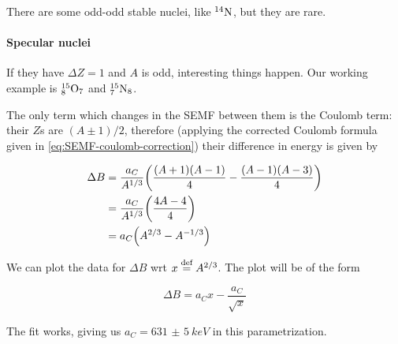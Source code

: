 \documentclass[main.tex]{subfiles}
\begin{document}
There are some odd-odd stable nuclei, like \(^{14} \ce{N} \), but they are rare.

\paragraph{Specular nuclei}

If they have \(\Delta Z = 1\) and \(A\) is odd, interesting things happen. Our working example is \(^{15} _{8   } \ce{O} _{7} \) and \(^{15} _{7} \ce{N}_8 \).

The only term which changes in the SEMF between them is the Coulomb term: their \(Z\)s are \((A \pm 1)/2\), therefore (applying the corrected Coulomb formula given in \eqref{eq:SEMF-coulomb-correction}) their difference in energy is given by

\begin{subequations}
\begin{align}
  \Delta B  &= \frac{a_C}{A^{1/3}} \qty(\frac{(A+1)(A-1)}{4} - \frac{(A-1)(A-3)}{4})  \\
  &= \frac{a_C}{A^{1/3}} \qty(\frac{4A -4}{4})  \\
  &= a_C \qty(A^{2/3} - A^{-1/3})
\end{align}
\end{subequations}

We can plot the data for \(\Delta B\) wrt \(x \stackrel{\text{def}}{=} A^{2/3}\). The plot will be of the form

\begin{equation}
    \Delta B  = a_C x - \frac{a_C}{\sqrt{x}}
\end{equation}

The fit works, giving us \(a_C = \SI{631(5)}{keV}\) in this parametrization.
\end{document}
